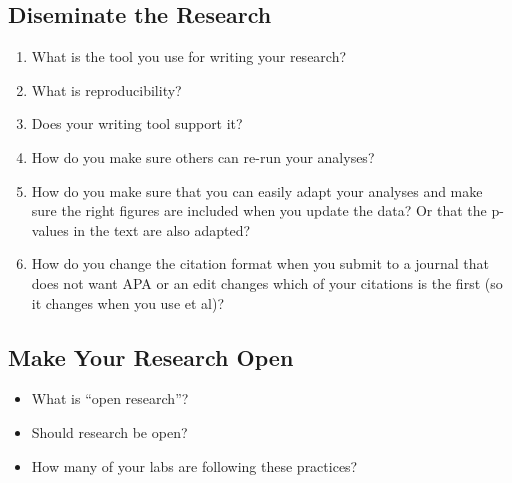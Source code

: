 \documentclass[
  letterpaper,
  DIV=11,
  numbers=noendperiod]{scrreprt}
\providecommand{\tightlist}{%
  \setlength{\itemsep}{0pt}\setlength{\parskip}{0pt}}\usepackage{longtable,booktabs,array}
\begin{document}
\subsection{Diseminate the Research}\label{diseminate-the-research}

\begin{enumerate}
\def\labelenumi{\arabic{enumi}.}
\tightlist
\item
  What is the tool you use for writing your research?
\item
  What is reproducibility?
\item
  Does your writing tool support it?
\item
  How do you make sure others can re-run your analyses?
\item
  How do you make sure that you can easily adapt your analyses and make
  sure the right figures are included when you update the data? Or that
  the p-values in the text are also adapted?
\item
  How do you change the citation format when you submit to a journal
  that does not want APA or an edit changes which of your citations is
  the first (so it changes when you use et al)?
\end{enumerate}

\subsection{Make Your Research Open}\label{make-your-research-open}

\begin{tcolorbox}[enhanced jigsaw, opacityback=0, leftrule=.75mm, colback=white, left=2mm, titlerule=0mm, toprule=.15mm, toptitle=1mm, coltitle=black, title=\textcolor{quarto-callout-tip-color}{\faLightbulb}\hspace{0.5em}{Class Question}, opacitybacktitle=0.6, colbacktitle=quarto-callout-tip-color!10!white, breakable, bottomrule=.15mm, bottomtitle=1mm, colframe=quarto-callout-tip-color-frame, arc=.35mm, rightrule=.15mm]

\begin{itemize}
\tightlist
\item
  What is ``open research''?
\item
  Should research be open?
\item
  How many of your labs are following these practices?
\end{itemize}

\end{tcolorbox}
\end{document}
